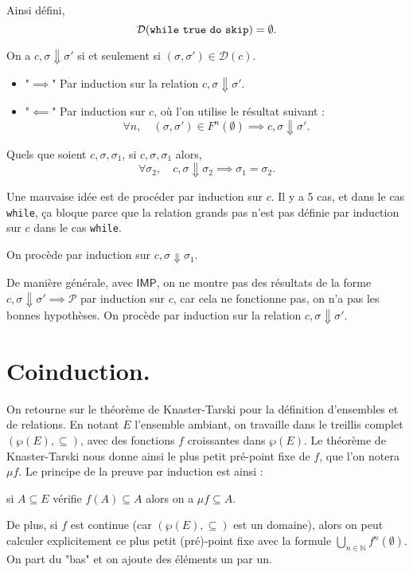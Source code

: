 \documentclass[../main]{subfiles}
\begin{document}
  \begin{exm}
    Ainsi défini, \[
      \mathcal{D}(\texttt{while}\ \texttt{true}\ \texttt{do}\ \texttt{skip}) = \emptyset
    .\]
  \end{exm}

  \begin{thm}
    On a $c, \sigma \Downarrow \sigma'$ si et seulement si $(\sigma, \sigma') \in \mathcal{D}(c)$.
  \end{thm}
  \begin{prv}
    \begin{itemize}
      \item "$\implies$" Par induction sur la relation $c, \sigma \Downarrow \sigma'$.
      \item "$\impliedby$" Par induction sur $c$,
        où l'on utilise le résultat suivant :
        \[
        \forall n, \quad (\sigma, \sigma') \in F^n(\emptyset) \implies c, \sigma  \Downarrow \sigma'
        .\]
    \end{itemize}
  \end{prv}

  \begin{lem}
    Quels que soient $c, \sigma, \sigma_1$, si $c, \sigma, \sigma_1$ alors, \[
    \forall \sigma_2, \quad c, \sigma \Downarrow \sigma_2 \implies \sigma_1 = \sigma_2
    .\]
  \end{lem}
  \begin{prv}
    Une mauvaise idée est de procéder par induction sur $c$.
    Il y a 5 cas, et dans le cas  \texttt{while}, ça bloque parce que la relation grands pas n'est pas définie par induction sur $c$ dans le cas \texttt{while}.

    On procède par induction sur $c, \sigma \Downarrow \sigma_1$.
  \end{prv}

  De manière générale, avec $\mathsf{IMP}$, on ne montre pas des résultats de la forme $c, \sigma \Downarrow \sigma' \implies \mathcal{P}$ par induction sur $c$, car cela ne fonctionne pas, on n'a pas les bonnes hypothèses.
  On procède par induction sur la relation $c, \sigma \Downarrow \sigma'$.

  \section{Coinduction.}

  On retourne sur le théorème de Knaster-Tarski pour la définition d'ensembles et de relations.
  En notant $E$ l'ensemble ambiant, on travaille dans le treillis complet $(\wp(E), \subseteq)$, avec des fonctions $f$ croissantes dans $\wp(E)$.
  Le théorème de Knaster-Tarski nous donne ainsi le plus petit pré-point fixe de $f$, que l'on notera $\mu f$.
  Le principe de la preuve par induction est ainsi :
  \begin{center}
    si $A \subseteq E$ vérifie $f(A) \subseteq A$ alors on a $\mu f \subseteq A$.
  \end{center}
  De plus, si $f$ est continue (car $(\wp(E), \subseteq)$ est un domaine), alors on peut calculer explicitement ce plus petit (pré)-point fixe avec la formule $\bigcup_{n \in \mathds{N}} f^n(\emptyset)$.
  On part du "bas" et on ajoute des éléments un par un.
\end{document}
